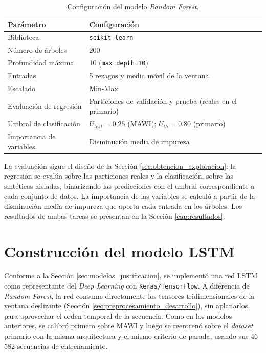 \documentclass[12pt]{report}
\begin{document}
\begin{table}[H]
    \centering
    \begin{tabular}{|l|p{6cm}|}
        \hline
        \textbf{Parámetro} & \textbf{Configuración} \\
        \hline
        Biblioteca & \texttt{scikit-learn} \\
        Número de árboles & 200 \\
        Profundidad máxima & 10 (\texttt{max\_depth=10}) \\
        Entradas & 5 rezagos y media móvil de la ventana \\
        Escalado & Min-Max \\
        Evaluación de regresión & Particiones de validación y prueba (reales en el primario) \\
        Umbral de clasificación & $U_{test}=0.25$ (MAWI); $U_{th}=0.80$ (primario) \\
        Importancia de variables & Disminución media de impureza \\
        \hline
    \end{tabular}
    \caption{Configuración del modelo \textit{Random Forest}.}
    \label{tab:config_rf}
\end{table}

La evaluación sigue el diseño de la Sección \ref{sec:obtencion_exploracion}: la regresión se evalúa sobre las particiones reales y la clasificación, sobre las sintéticas aisladas, binarizando las predicciones con el umbral correspondiente a cada conjunto de datos. La importancia de las variables se calculó a partir de la disminución media de impureza que aporta cada entrada en los árboles. Los resultados de ambas tareas se presentan en la Sección \ref{cap:resultados}.

\section{Construcción del modelo LSTM}
\label{sec:lstm_desarrollo}

Conforme a la Sección \ref{sec:modelos_justificacion}, se implementó una red LSTM como representante del \textit{Deep Learning} con \texttt{Keras/TensorFlow}. A diferencia de \textit{Random Forest}, la red consume directamente los tensores tridimensionales de la ventana deslizante (Sección \ref{sec:preprocesamiento_desarrollo}), sin aplanarlos, para aprovechar el orden temporal de la secuencia. Como en los modelos anteriores, se calibró primero sobre MAWI y luego se reentrenó sobre el \textit{dataset} primario con la misma arquitectura y el mismo criterio de parada, usando sus 46\,582 secuencias de entrenamiento.
\end{document}
